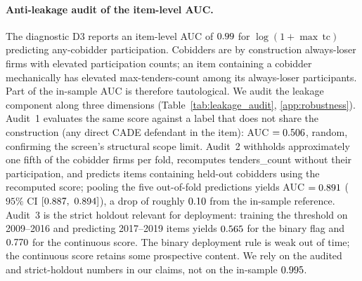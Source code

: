 \paragraph{Anti-leakage audit of the item-level AUC.}
The diagnostic D3 reports an item-level AUC of $0.99$ for
$\log(1{+}\max\,\text{tc})$ predicting any-cobidder
participation. Cobidders are by construction always-loser
firms with elevated participation counts; an item containing a
cobidder mechanically has elevated max-tenders-count among its
always-loser participants. Part of the in-sample AUC is
therefore tautological. We audit the leakage component along
three dimensions (Table~\ref{tab:leakage_audit},
\ref{app:robustness}). Audit~1 evaluates the same score
against a label that does not share the construction (any
direct CADE defendant in the item): AUC $=0.506$, random,
confirming the screen's structural scope limit. Audit~2
withholds approximately one fifth of the cobidder firms per
fold, recomputes tenders\_count without their participation,
and predicts items containing held-out cobidders using the
recomputed score; pooling the five out-of-fold predictions
yields AUC $=0.891$ ($95\%$ CI $[0.887,\ 0.894]$), a drop of
roughly $0.10$ from the in-sample reference. Audit~3 is the
strict holdout relevant for deployment: training the threshold
on 2009--2016 and predicting 2017--2019 items yields
$0.565$ for the binary flag and
$0.770$ for the continuous score. The binary
deployment rule is weak out of time; the continuous score
retains some prospective content. We rely on the audited and
strict-holdout numbers in our claims, not on the in-sample
$0.995$.



